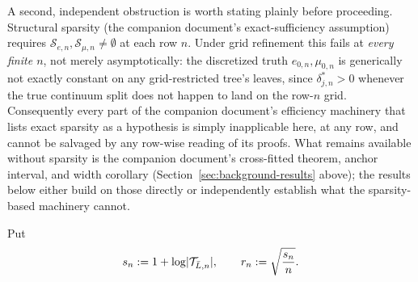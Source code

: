 \documentclass[11pt]{article}
\theoremstyle{plain}
\theoremstyle{definition}
\theoremstyle{remark}
\newcommand{\cT}{\mathcal{T}}
\newcommand{\cS}{\mathcal{S}}
\DeclarePairedDelimiter{\card}{\lvert}{\rvert}
\newcommand{\ezn}{e_{0,n}}
\newcommand{\mzn}{\mu_{0,n}}
\begin{document}
A second, independent obstruction is worth stating plainly before
proceeding. Structural sparsity (the companion document's exact-sufficiency
assumption) requires $\cS_{e,n},\cS_{\mu,n}\ne\emptyset$ at each row $n$.
Under grid refinement this fails at \emph{every finite $n$}, not merely
asymptotically: the discretized truth $\ezn,\mzn$ is generically not exactly
constant on any grid-restricted tree's leaves, since $\delta^*_{j,n}>0$
whenever the true continuum split does not happen to land on the row-$n$
grid. Consequently every part of the companion document's efficiency
machinery that lists exact sparsity as a hypothesis is simply inapplicable
here, at any row, and cannot be salvaged by any row-wise reading of its
proofs. What remains available without sparsity is the companion
document's cross-fitted theorem, anchor interval, and width corollary
(Section~\ref{sec:background-results} above); the results below either
build on those directly or independently establish what the sparsity-based
machinery cannot.

Put
\[
  s_n:=1+\log\card{\cT_{\bar L,n}},
  \qquad
  r_n:=\sqrt{\frac{s_n}{n}}.
\]
\end{document}
